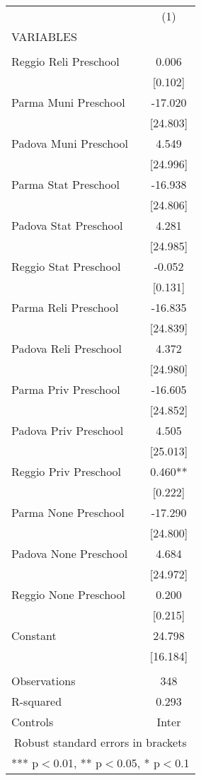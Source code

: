 \begin{tabular}{lc} \hline
 & (1) \\
VARIABLES &  \\ \hline
 &  \\
Reggio Reli Preschool & 0.006 \\
 & [0.102] \\
Parma Muni Preschool & -17.020 \\
 & [24.803] \\
Padova Muni Preschool & 4.549 \\
 & [24.996] \\
Parma Stat Preschool & -16.938 \\
 & [24.806] \\
Padova Stat Preschool & 4.281 \\
 & [24.985] \\
Reggio Stat Preschool & -0.052 \\
 & [0.131] \\
Parma Reli Preschool & -16.835 \\
 & [24.839] \\
Padova Reli Preschool & 4.372 \\
 & [24.980] \\
Parma Priv Preschool & -16.605 \\
 & [24.852] \\
Padova Priv Preschool & 4.505 \\
 & [25.013] \\
Reggio Priv Preschool & 0.460** \\
 & [0.222] \\
Parma None Preschool & -17.290 \\
 & [24.800] \\
Padova None Preschool & 4.684 \\
 & [24.972] \\
Reggio None Preschool & 0.200 \\
 & [0.215] \\
Constant & 24.798 \\
 & [16.184] \\
 &  \\
Observations & 348 \\
R-squared & 0.293 \\
 Controls & Inter \\ \hline
\multicolumn{2}{c}{ Robust standard errors in brackets} \\
\multicolumn{2}{c}{ *** p$<$0.01, ** p$<$0.05, * p$<$0.1} \\
\end{tabular}
